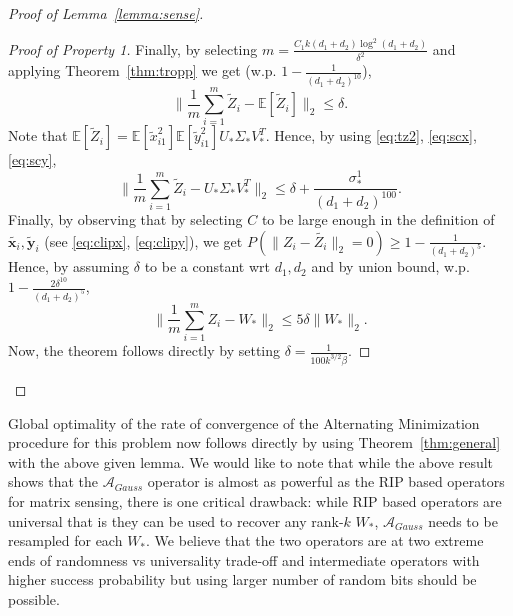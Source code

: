 \documentclass[11pt]{article}
\newcommand{\wt}[1]{\widetilde{#1}}
\newcommand{\tp}[1]{{#1}^{T}}
\newcommand{\calA}{\mathcal{A}}
\newcommand{\E}{\mathbb{E}}
\newcommand{\Vot}{\tp{V}_*}
\newcommand{\So}{\Sigma_*}
\newcommand{\Uo}{U_*}
\newcommand{\Wo}{W_*}
\newcommand{\x}{\bm{x}}
\newcommand{\y}{\bm{y}}
\begin{document}
\begin{proof}[Proof of Lemma~\ref{lemma:sense}]
\begin{proof}[Proof of Property 1]
Finally, by selecting $m=\frac{C_1 k (d_1+d_2) \log^2(d_1+d_2)}{\delta^2}$ and applying Theorem~\ref{thm:tropp} we get (w.p. $1-\frac{1}{(d_1+d_2)^{10}}$), 
\begin{equation}
  \label{eq:tz2}
  \|\frac{1}{m}\sum_{i=1}^m \wt{Z}_i - \E[\wt{Z}_i]\|_2 \leq \delta. 
\end{equation}
Note that $\E[\wt{Z}_i]=\E[\wt{x}_{i1}^2]\E[\wt{y}_{i1}^2]\Uo\So\Vot $. Hence, by using \eqref{eq:tz2}, \eqref{eq:scx}, \eqref{eq:scy}, 
 $$\|\frac{1}{m}\sum_{i=1}^m \wt{Z}_i - \Uo\So\Vot\|_2\leq \delta+\frac{\sigma_*^{1}}{(d_1+d_2)^{100}}.$$
Finally, by  observing that by selecting $C$ to be large enough in the definition of $\wt{\x_i},\wt{\y}_i$ (see \eqref{eq:clipx}, \eqref{eq:clipy}), we get $P(\|Z_i-\wt{Z_i}\|_2=0)\geq 1-\frac{1}{(d_1+d_2)^5}$. Hence, by assuming $\delta$ to be a constant wrt $d_1, d_2$ and by union bound, w.p. $1-\frac{2\delta^{10}}{(d_1+d_2)^5}$, 
$$\|\frac{1}{m}\sum_{i=1}^m Z_i -\Wo\|_2\leq 5\delta\|\Wo\|_2.$$
Now, the theorem follows directly by setting $\delta= \frac{1}{100 k^{3/2} \beta}$. %
\end{proof}
\end{proof}

Global optimality of the rate of convergence of the Alternating Minimization procedure for this problem now follows directly by using Theorem~\ref{thm:general} with the above given lemma. We would like to note that while the above result shows that the $\calA_{Gauss}$ operator is almost as powerful as the RIP based operators for matrix sensing, there is one critical drawback: while RIP based operators are universal that is they can be used to recover any rank-$k$ $\Wo$, $\calA_{Gauss}$ needs to be resampled for each $\Wo$. We believe that the two operators are at two extreme ends of randomness vs universality trade-off and intermediate operators with higher success probability but using larger number of random bits should be possible.  


\end{document}
